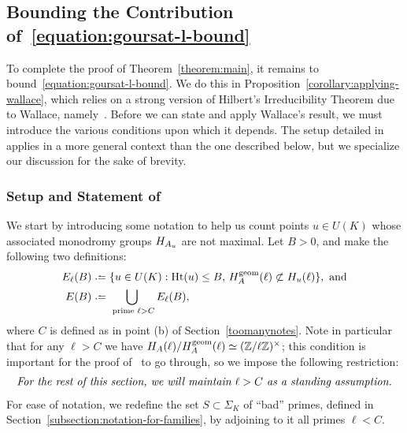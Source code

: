 \subsection{Bounding the Contribution of~\eqref{equation:goursat-l-bound}} \label{subsection:applying-wallace}
	
To complete the proof of Theorem~\ref{theorem:main}, it remains to bound~\eqref{equation:goursat-l-bound}. We do this in Proposition~\ref{corollary:applying-wallace}, which relies on a strong version of Hilbert's Irreducibility Theorem due to Wallace, namely~\cite[Theorem 3.9]{scoopdedoo}. Before we can state and apply Wallace's result, we must introduce the various conditions upon which it depends. The setup detailed in~\cite[Section 3.2]{scoopdedoo} applies in a more general context than the one described below, but we specialize our discussion for the sake of brevity.

\subsubsection{Setup and Statement of~\cite[Theorem 3.9]{scoopdedoo}}
\label{subsubsection:setup-and-statement-of-wallace}

We start by introducing some notation to help us count points $u \in U(K)$ whose associated monodromy groups $H_{A_u}$ are not maximal. Let $B > 0$, and make the following two definitions:
		\begin{align*}
		E_\ell(B) & \defeq \{u \in U(K) : \on{Ht}(u) \le B,\, \mono_A^{\on{geom}}(\ell) \not\subset \mono_u(\ell) \}, \text{ and}\\
		E(B) &\defeq \bigcup_{\text{ prime }\ell > C} E_{\ell}(B),
	\end{align*}
where $C$ is defined as in point (b) of Section~\ref{toomanynotes}.
Note in particular that for any $\ell > C$ we have $H_A(\ell) / H_A^{\operatorname{geom}}(\ell) \simeq (\mathbb Z/\ell \mathbb Z)^\times$; this condition is important for the proof of~\cite[Theorem 3.9]{scoopdedoo} to go through, so we impose the following restriction:
\vspace*{0.1cm}
\begin{align}\label{thatswhatpeoplesay}
\text{\emph{For the rest of this section, we will maintain $\ell > C$ as a standing assumption.}}
\end{align}
For ease of notation, we redefine the set $S \subset \Sigma_K$ of ``bad'' primes, defined in Section~\ref{subsection:notation-for-families}, by adjoining to it all primes $\ell < C$.

